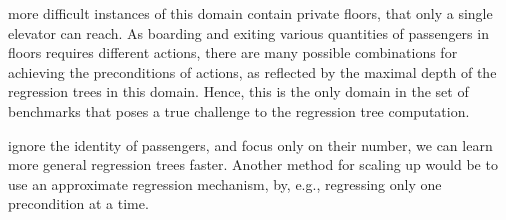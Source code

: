 \documentclass[letterpaper]{article}
\theoremstyle{definition}
\begin{document}
\begin{table}[t!]
\centering
\footnotesize
{}
\caption{Projection computation metrics over a large problem from each domain.}
\label{tbl:projection}
\end{table}


 more difficult instances of this domain contain private floors, that only a single elevator can reach. As boarding and exiting various quantities of passengers in floors requires different actions,  there are many possible combinations for achieving the preconditions of actions, as reflected by the maximal depth of the regression trees in this domain. Hence, this is the only domain in the set of benchmarks that poses a true challenge to the regression tree computation.

 ignore the identity of passengers, and focus only on their number, we can learn more general regression trees faster. Another method for scaling up would be to use an approximate regression mechanism, by, e.g., regressing only one precondition at a time.


\end{document}
